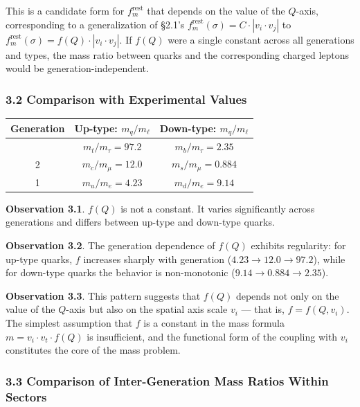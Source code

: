 \documentclass[
  a4paper,11pt]{article}
\newcounter{none}
\theoremstyle{definition}
\theoremstyle{remark}
\begin{document}
This is a candidate form for \(f_m^{\text{rest}}\) that depends on the
value of the \(Q\)-axis, corresponding to a generalization of §2.1's
\(f_m^{\text{rest}}(\sigma) = C \cdot |v_i \cdot v_j|\) to
\(f_m^{\text{rest}}(\sigma) = f(Q) \cdot |v_i \cdot v_j|\). If \(f(Q)\)
were a single constant across all generations and types, the mass ratio
between quarks and the corresponding charged leptons would be
generation-independent.

\subsubsection{3.2 Comparison with Experimental
Values}\label{comparison-with-experimental-values}

{\def\LTcaptype{none} %
\begin{longtable}[]{@{}ccc@{}}
\toprule\noalign{}
Generation & Up-type: \(m_q / m_\ell\) & Down-type: \(m_q / m_\ell\) \\
\midrule\noalign{}
\endhead
\bottomrule\noalign{}
\endlastfoot
3 & \(m_t / m_\tau = 97.2\) & \(m_b / m_\tau = 2.35\) \\
2 & \(m_c / m_\mu = 12.0\) & \(m_s / m_\mu = 0.884\) \\
1 & \(m_u / m_e = 4.23\) & \(m_d / m_e = 9.14\) \\
\end{longtable}
}

\textbf{Observation 3.1}. \(f(Q)\) is not a constant. It varies
significantly across generations and differs between up-type and
down-type quarks.

\textbf{Observation 3.2}. The generation dependence of \(f(Q)\) exhibits
regularity: for up-type quarks, \(f\) increases sharply with generation
(\(4.23 \to 12.0 \to 97.2\)), while for down-type quarks the behavior is
non-monotonic (\(9.14 \to 0.884 \to 2.35\)).

\textbf{Observation 3.3}. This pattern suggests that \(f(Q)\) depends
not only on the value of the \(Q\)-axis but also on the spatial axis
scale \(v_i\) --- that is, \(f = f(Q, v_i)\). The simplest assumption
that \(f\) is a constant in the mass formula
\(m = v_i \cdot v_t \cdot f(Q)\) is insufficient, and the functional
form of the coupling with \(v_i\) constitutes the core of the mass
problem.

\subsubsection{3.3 Comparison of Inter-Generation Mass Ratios Within
Sectors}\label{comparison-of-inter-generation-mass-ratios-within-sectors}
\end{document}
